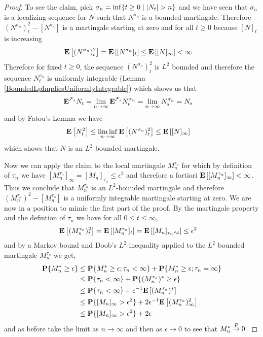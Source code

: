 \begin{proof}
To see the claim, pick $\sigma_n = \inf \lbrace t \geq 0 \mid \left \vert N_t \right \vert > n \rbrace$ and we have seen that $\sigma_n$ is a localizing sequence for $N$ such that $N^{\sigma_n}$ is a bounded martingale.  Therefore $(N^{\sigma_n})_t^2 - [N^{\sigma_n}]$ is a martingale starting at zero and for all $t \geq 0$ because $[N]_t$ is increasing
\begin{align*}
\textbf{E}\left[(N^{\sigma_n})_t^2\right] &= \textbf{E}\left[[N^{\sigma_n}]_t\right] \leq \textbf{E}\left[[N]_\infty\right] < \infty
\end{align*}
Therefore for fixed $t \geq 0$, the sequence $(N^{\sigma_n})^2_t$ is $L^2$ bounded and therefore the sequence $N^{\sigma_n}_t$ is uniformly integrable (Lemma \ref{BoundedLpImpliesUniformlyIntegrable}) which shows us that 
\begin{align*}
\textbf{E}^{\mathcal{F}_s} N_t   &= \lim_{n \to \infty} \textbf{E}^{\mathcal{F}_s} N^{\sigma_n}_t = \lim_{n \to \infty} N^{\sigma_n}_s = N_s
\end{align*}
and by Fatou's Lemma we have 
\begin{align*}
\textbf{E}\left[N_t^2\right] &\leq \liminf_{n \to \infty} \textbf{E}\left[ (N^{\sigma_n})_t^2\right] \leq \textbf{E}\left[[N]_\infty\right]
\end{align*}
which shows that $N$ is an $L^2$ bounded martingale.

Now we can apply the claim to the local martingale $M^{\tau_n}_n$ for which by definition of $\tau_n$ we have $[M^{\tau_n}_n]_\infty = [M_n]_{\tau_n} \leq \epsilon^2$ and therefore a fortiori $\textbf{E}\left[[M^{\tau_n}_n]_\infty\right] < \infty$.  Thus we conclude that $M^{\tau_n}_n$ is an $L^2$-bounded martingale and therefore $(M^{\tau_n}_n)^2 - [M^{\tau_n}_n]$ is a uniformly integrable martingale starting at zero.  We are now in a position to mimic the first part of the proof.   By the martingale property and the defintion of $\tau_n$ we have for all $0 \leq t \leq \infty$,
\begin{align*}
\textbf{E}\left[(M^{\tau_n}_n)_t^2\right] &= \textbf{E}\left[ [M^{\tau_n}_n]_t \right] = \textbf{E}\left[ [M_n]_{\tau_n \wedge t} \right] \leq \epsilon^2
\end{align*}
and by a Markov bound and Doob's $L^2$ inequality applied to the $L^2$ bounded martingale $M^{\tau_n}_n$ we get,
\begin{align*}
\textbf{P}\{M^*_n \geq \epsilon\} &\leq \textbf{P}\{M^*_n \geq \epsilon; \tau_n < \infty \}  + \textbf{P}\{M^*_n \geq \epsilon ; \tau_n = \infty\} \\
&\leq \textbf{P}\{\tau_n < \infty \}  + \textbf{P}\{(M^{\tau_n}_n)^* \geq \epsilon\} \\
&\leq \textbf{P}\{\tau_n < \infty \}  + \epsilon^{-1} \textbf{E}\left[(M^{\tau_n}_n)^*\right] \\
&\leq \textbf{P}\{[M_n]_\infty > \epsilon^2 \}  + 2 \epsilon^{-1} \textbf{E}\left[(M^{\tau_n}_n)^2_\infty\right] \\
&\leq \textbf{P}\{[M_n]_\infty > \epsilon^2 \}  + 2 \epsilon \\
\end{align*}
and as before take the limit as $n \to \infty$ and then as $\epsilon \to 0$ to see that $M^*_n \overset{P}\to 0$.
\end{proof}

